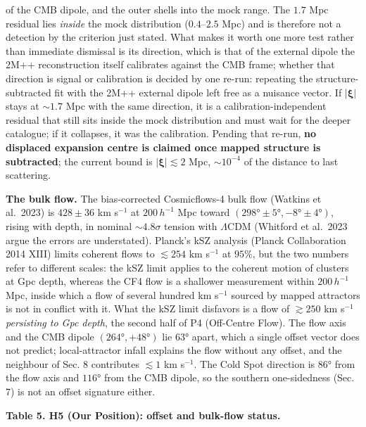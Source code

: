 \documentclass[
]{article}
\begin{document}
of the CMB dipole, and the outer shells into the mock range. The \(1.7\)
Mpc residual lies \emph{inside} the mock distribution (\(0.4\)--\(2.5\)
Mpc) and is therefore not a detection by the criterion just stated. What
makes it worth one more test rather than immediate dismissal is its
direction, which is that of the external dipole the 2M++ reconstruction
itself calibrates against the CMB frame; whether that direction is
signal or calibration is decided by one re-run: repeating the
structure-subtracted fit with the 2M++ external dipole left free as a
nuisance vector. If \(|\boldsymbol{\xi}|\) stays at \(\sim\!1.7\) Mpc
with the same direction, it is a calibration-independent residual that
still sits inside the mock distribution and must wait for the deeper
catalogue; if it collapses, it was the calibration. Pending that re-run,
\textbf{no displaced expansion centre is claimed once mapped structure
is subtracted}; the current bound is \(|\boldsymbol{\xi}| \lesssim 2\)
Mpc, \(\sim\!10^{-4}\) of the distance to last scattering.

\textbf{The bulk flow.} The bias-corrected Cosmicflows-4 bulk flow
(Watkins et al.~2023) is \(428 \pm 36\) km s\(^{-1}\) at \(200\,h^{-1}\)
Mpc toward \((298° \pm 5°, -8° \pm 4°)\), rising with depth, in nominal
\(\sim\!4.8\sigma\) tension with \(\Lambda\)CDM (Whitford et al.~2023
argue the errors are understated). Planck's kSZ analysis (Planck
Collaboration 2014 XIII) limits coherent flows to \(\lesssim 254\) km
s\(^{-1}\) at \(95\%\), but the two numbers refer to different scales:
the kSZ limit applies to the coherent motion of clusters at Gpc depth,
whereas the CF4 flow is a shallower measurement within \(200\,h^{-1}\)
Mpc, inside which a flow of several hundred km s\(^{-1}\) sourced by
mapped attractors is not in conflict with it. What the kSZ limit
disfavors is a flow of \(\gtrsim 250\) km s\(^{-1}\) \emph{persisting to
Gpc depth}, the second half of P4 (Off-Centre Flow). The flow axis and
the CMB dipole \((264°, +48°)\) lie \(63°\) apart, which a single offset
vector does not predict; local-attractor infall explains the flow
without any offset, and the neighbour of Sec. 8 contributes
\(\lesssim 1\) km s\(^{-1}\). The Cold Spot direction is \(86°\) from
the flow axis and \(116°\) from the CMB dipole, so the southern
one-sidedness (Sec. 7) is not an offset signature either.

\textbf{Table 5. H5 (Our Position): offset and bulk-flow status.}
\end{document}
